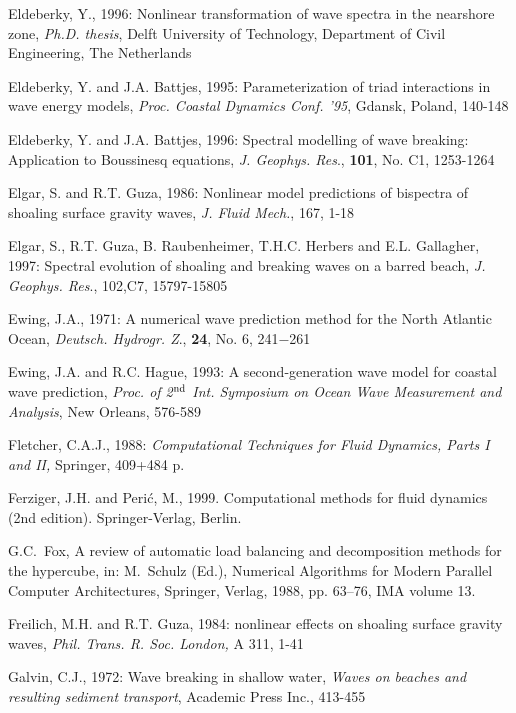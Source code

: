 \documentclass[12pt]{book}
\begin{document}
\begin{thebibliography}{10}
Eldeberky, Y., 1996: Nonlinear transformation of wave spectra in the nearshore zone, {\it Ph.D. thesis}, Delft
University of Technology, Department of Civil Engineering, The Netherlands

Eldeberky, Y. and J.A. Battjes, 1995: Parameterization of triad interactions in wave energy models, {\it Proc.
Coastal Dynamics Conf. '95}, Gdansk, Poland, 140-148

Eldeberky, Y. and J.A. Battjes, 1996: Spectral modelling of wave breaking: Application to Boussinesq
equations, {\it J. Geophys. Res}., {\bf 101}, No. C1, 1253-1264

Elgar, S. and R.T. Guza, 1986: Nonlinear model predictions of bispectra of shoaling surface gravity waves,
{\it J. Fluid Mech.}, 167, 1-18

Elgar, S., R.T. Guza, B. Raubenheimer, T.H.C. Herbers and E.L. Gallagher, 1997: Spectral evolution of
shoaling and breaking waves on a barred beach, {\it J. Geophys. Res}., 102,C7, 15797-15805

Ewing, J.A., 1971: A numerical wave prediction method for the North Atlantic Ocean, {\it Deutsch. Hydrogr. Z}.,
{\bf 24}, No. 6, 241$-$261

Ewing, J.A. and R.C. Hague, 1993: A second-generation wave model for coastal wave prediction, {\it Proc.
of 2$^{{\rm nd}}$ Int. Symposium on Ocean Wave Measurement and Analysis}, New Orleans, 576-589

Fletcher, C.A.J., 1988: {\it Computational Techniques for Fluid Dynamics, Parts I and II,} Springer, 409+484
p.

Ferziger, J.H. and Peri\'{c}, M., 1999. Computational methods for fluid dynamics (2nd edition).
  Springer-Verlag, Berlin.

G.C.~Fox, A review of automatic load balancing and decomposition methods for the
  hypercube, in: M.~Schulz (Ed.), Numerical Algorithms for Modern Parallel
  Computer Architectures, Springer, Verlag, 1988, pp. 63--76, IMA volume 13.

Freilich, M.H. and R.T. Guza, 1984: nonlinear effects on shoaling surface gravity waves, {\it Phil. Trans. R.
Soc. London, }A 311, 1-41

Galvin, C.J., 1972: Wave breaking in shallow water, {\it Waves on beaches and resulting sediment transport},
Academic Press Inc., 413-455


\end{thebibliography}
\end{document}
